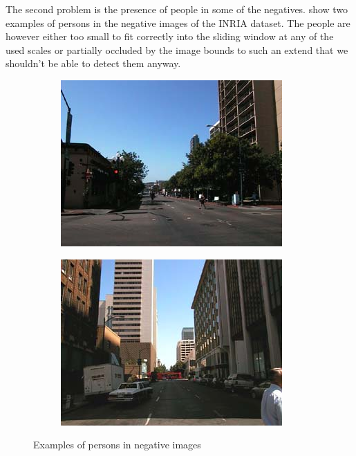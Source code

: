 \documentclass[thesis.tex]{subfiles}
\begin{document}
The second problem is the presence of people in some of the negatives.
 show two examples of persons in the negative images of the INRIA dataset. The people are however either too small to fit correctly into the sliding window at any of the used scales or partially occluded by the image bounds to such an extend that we shouldn't be able to detect them anyway.

\begin{figure}[tb]
	\begin{subfigure}[t]{0.5\textwidth}
		\includegraphics[width=\textwidth]{img/inriaManExample1.png}
	\end{subfigure}
	\begin{subfigure}[t]{0.5\textwidth}
		\includegraphics[width=\textwidth]{img/inriaManOccluded.png}
	\end{subfigure}
	\caption{Examples of persons in negative images}
	\label{fig:inriaNegativePersons}
\end{figure}
\end{document}
